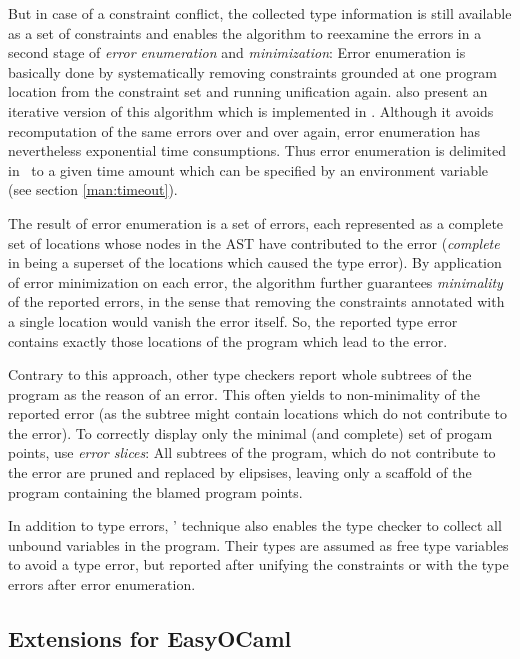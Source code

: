 But in case of a constraint conflict, the collected type information is still
available as a set of constraints and enables the algorithm to reexamine the
errors in a second stage of \emph{error enumeration} and \emph{minimization}:
Error enumeration is basically done by systematically removing constraints
grounded at one program location from the constraint set and running unification
again.
\citet{haackwells04} also present an iterative version of this algorithm which
is implemented in \easyocaml. Although it avoids recomputation of the same
errors over and over again, error enumeration has nevertheless exponential time
consumptions. Thus error enumeration is delimited in \easyocaml\ to a given time
amount which can be specified by an environment variable (see section
\ref{man:timeout}).

The result of error enumeration is a set of errors, each represented as a
complete set of locations whose nodes in the AST have contributed to the error
(\emph{complete} in being a superset of the locations which caused the type
error). By application of error minimization on each error, the algorithm
further guarantees \emph{minimality} of the reported errors, in the sense that
removing the constraints annotated with a single location would vanish the error
itself.
So, the reported type error contains exactly those locations of the program
which lead to the error.

Contrary to this approach, other type checkers report whole subtrees of the
program as the reason of an error. This often yields to non-minimality of the
reported error (as the subtree might contain locations which do not contribute
to the error). To correctly display only the minimal (and complete) set of
progam points, \citeauthor{haackwells04} use \emph{error slices}: All subtrees
of the program, which do not contribute to the error are pruned and replaced by
elipsises, leaving only a scaffold of the program containing the blamed program
points.

In addition to type errors, \citeauthor{haackwells04}' technique also enables the 
type checker to collect all unbound variables in the program.
Their types are assumed as free type variables to avoid a type error, but
reported after unifying the constraints or with the type errors after error
enumeration.


\subsection{Extensions for EasyOCaml}
\label{sec:extending}

